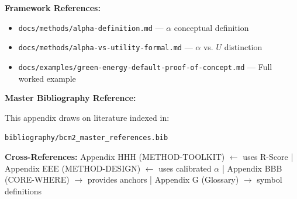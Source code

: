 \textbf{Framework References:}
\begin{itemize}[nosep]
\item \texttt{docs/methods/alpha-definition.md} --- $\alpha$ conceptual definition
\item \texttt{docs/methods/alpha-vs-utility-formal.md} --- $\alpha$ vs. $U$ distinction
\item \texttt{docs/examples/green-energy-default-proof-of-concept.md} --- Full worked example
\end{itemize}

\textbf{Master Bibliography Reference:}

This appendix draws on literature indexed in:

\texttt{bibliography/bcm2\_master\_references.bib}

\nocite{bcm2_master}


\begin{tcolorbox}[colback=gray!5!white, colframe=gray!50!black]
\small
\textbf{Cross-References:}
Appendix HHH (METHOD-TOOLKIT) $\leftarrow$ uses R-Score |
Appendix EEE (METHOD-DESIGN) $\leftarrow$ uses calibrated $\alpha$ |
Appendix BBB (CORE-WHERE) $\rightarrow$ provides anchors |
Appendix G (Glossary) $\rightarrow$ symbol definitions
\end{tcolorbox}

